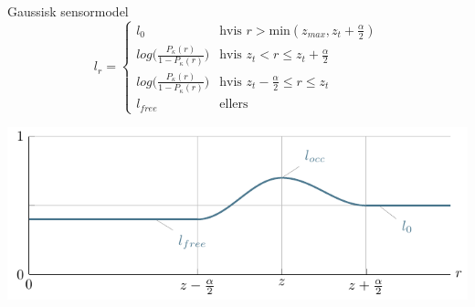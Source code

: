   
\begin{frame}{Gaussisk sensormodel}
\[
	l_{r} = \begin{cases} 
		l_0 &\text{hvis }r > \text{min}(z_{max},z_t+\frac{\alpha}{2}) \\
		log\Big(\frac{P_\kappa(r)}{1-P_\kappa(r)}\Big) &\text{hvis } z_t < r \leq z_t+\frac{\alpha}{2} \\
		log\Big(\frac{P_\kappa(r)}{1-P_\kappa(r)}\Big) &\text{hvis } z_t-\frac{\alpha}{2} \leq r \leq z_t \\
		l_{free} &\text{ellers}	
	\end{cases} 
\]

\includegraphics{gaussian_sensormodel.pdf}
\end{frame}


